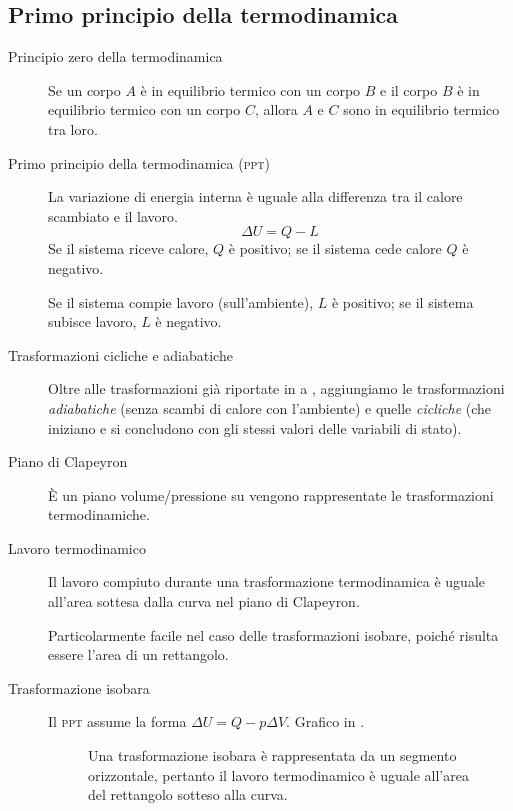 \documentclass[a4paper,11pt,italian]{article}
\begin{document}
\subsection{Primo principio della termodinamica}

\begin{description}
  \item[Principio zero della termodinamica] 
  Se un corpo $ A $ è in equilibrio termico con un corpo $ B $ e il corpo $ B $ è in equilibrio termico con un corpo $ C $, allora $ A $ e $ C $ sono in equilibrio termico tra loro.
  
  \item[Primo principio della termodinamica (\textsc{ppt})] 
  La variazione di energia interna è uguale alla differenza tra il calore scambiato e il lavoro.
  \[ \Delta U = Q - L \]
  Se il sistema riceve calore, $ Q $ è positivo; se il sistema cede calore $ Q $ è negativo.
  
  Se il sistema compie lavoro (sull'ambiente), $ L $ è positivo; se il sistema subisce lavoro, $ L $ è negativo.
  
  \item[Trasformazioni cicliche e adiabatiche] 
  Oltre alle trasformazioni già riportate in  a , aggiungiamo le trasformazioni \emph{adiabatiche} (senza scambi di calore con l'ambiente) e quelle \emph{cicliche} (che iniziano e si concludono con gli stessi valori delle variabili di stato).
  
  \item[Piano di Clapeyron] 
  È un piano volume/pressione su vengono rappresentate le trasformazioni termodinamiche.
  
  \item[Lavoro termodinamico] 
  Il lavoro compiuto durante una trasformazione termodinamica è uguale all'area sottesa dalla curva nel piano di Clapeyron.
  
  Particolarmente facile nel caso delle trasformazioni isobare, poiché risulta essere l'area di un rettangolo.
  
  \item[Trasformazione isobara] 
  Il \textsc{ppt} assume la forma $ \Delta U = Q - p \Delta V $. Grafico in .
  
\begin{figure}[htp]\centering

\caption{Una trasformazione isobara è rappresentata da un segmento orizzontale, pertanto il lavoro termodinamico è uguale all'area del rettangolo sotteso alla curva.}
\label{img:isobara}
\end{figure}
  

\end{description}
\end{document}
